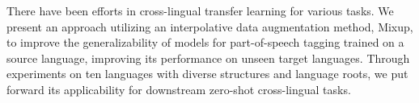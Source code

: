 There have been efforts in cross-lingual transfer learning for various tasks. We present an approach utilizing an interpolative data augmentation method, Mixup, to improve the generalizability of models for part-of-speech tagging trained on a source language, improving its performance on unseen target languages. Through experiments on ten languages with diverse structures and language roots, we put forward its applicability for downstream zero-shot cross-lingual tasks.
